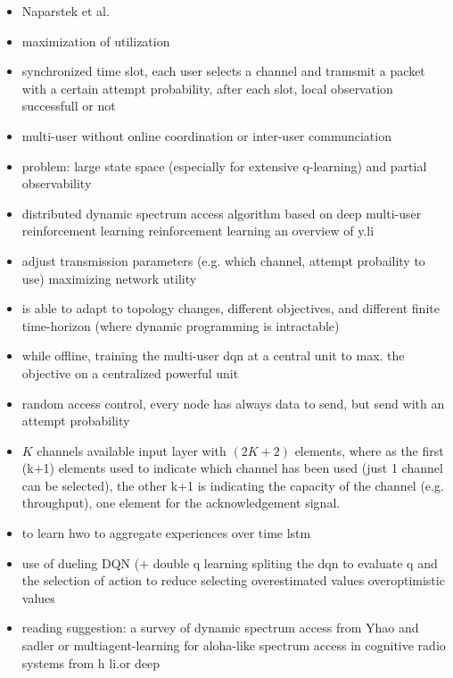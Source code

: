 \ifdefined\SHOWNOTES
\begin{itemize}
    \item Naparstek et al.
    \item maximization of utilization
    \item synchronized time slot, each user selects a channel and tramsmit a packet with a certain attempt probability, after each slot, local observation successfull or not
    \item multi-user without online coordination or inter-user communciation
    \item problem: large state space (especially for extensive q-learning) and partial observability
    \item distributed dynamic spectrum access algorithm based on deep multi-user reinforcement learning
     reinforcement learning an overview of y.li
    \item adjust transmission parameters (e.g. which channel, attempt probaility to use) \follows maximizing network utility
    \item is able to adapt to topology changes, different objectives, and different finite time-horizon (where dynamic programming is intractable)
    \item while offline, \follows training the multi-user dqn at a central unit to max. the objective on a centralized powerful unit
    \item random access control, every node has always data to send, but send with an attempt probability
    \item $K$ channels available \follows input layer with $(2K +2)$ elements, where as the first (k+1) elements used to indicate which channel has been used (just 1 channel can be selected), the other k+1 is indicating the capacity of the channel (e.g. throughput), one element for the acknowledgement signal.
    \item to learn hwo to aggregate experiences over time \follows lstm 
    \item use of dueling DQN (+ double q learning spliting the dqn to evaluate q and the selection of action to reduce selecting overestimated values \follows overoptimistic values
    \item reading suggestion: a survey of dynamic spectrum access from Yhao and sadler or multiagent-learning for aloha-like spectrum access in cognitive radio systems from h li.or deep
\end{itemize}
\fi
